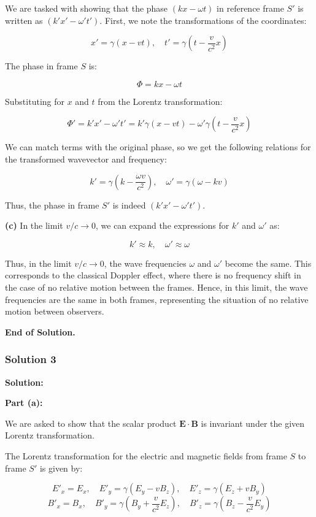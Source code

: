 \documentclass{article}
\begin{document}
We are tasked with showing that the phase \( (k x - \omega t) \) in reference frame \( S' \) is written as \( (k' x' - \omega' t') \). First, we note the transformations of the coordinates:

\[
x' = \gamma (x - v t), \quad t' = \gamma \left( t - \frac{v}{c^2} x \right)
\]

The phase in frame \( S \) is:

\[
\Phi = k x - \omega t
\]

Substituting for \( x \) and \( t \) from the Lorentz transformation:

\[
\Phi' = k' x' - \omega' t' = k' \gamma (x - v t) - \omega' \gamma \left( t - \frac{v}{c^2} x \right)
\]

We can match terms with the original phase, so we get the following relations for the transformed wavevector and frequency:

\[
k' = \gamma \left( k - \frac{\omega v}{c^2} \right), \quad \omega' = \gamma (\omega - k v)
\]

Thus, the phase in frame \( S' \) is indeed \( (k' x' - \omega' t') \).

\textbf{(c)} In the limit \( v / c \to 0 \), we can expand the expressions for \( k' \) and \( \omega' \) as:

\[
k' \approx k, \quad \omega' \approx \omega
\]

Thus, in the limit \( v / c \to 0 \), the wave frequencies \( \omega \) and \( \omega' \) become the same. This corresponds to the classical Doppler effect, where there is no frequency shift in the case of no relative motion between the frames. Hence, in this limit, the wave frequencies are the same in both frames, representing the situation of no relative motion between observers.

\textbf{End of Solution.}

\subsubsection{Solution 3}
\textbf{Solution:}

\textbf{Part (a):} 

We are asked to show that the scalar product \( \mathbf{E} \cdot \mathbf{B} \) is invariant under the given Lorentz transformation.

The Lorentz transformation for the electric and magnetic fields from frame \( S \) to frame \( S' \) is given by:

\[
E'_x = E_x, \quad E'_y = \gamma (E_y - v B_z), \quad E'_z = \gamma (E_z + v B_y)
\]
\[
B'_x = B_x, \quad B'_y = \gamma \left( B_y + \frac{v}{c^2} E_z \right), \quad B'_z = \gamma \left( B_z - \frac{v}{c^2} E_y \right)
\]
\end{document}
